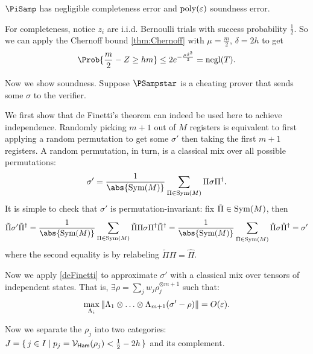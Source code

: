 \begin{thm}
    \label{QPIP1thm}
	$\PiSamp$ has negligible completeness error and $\operatorname*{\operatorname{poly}}(\varepsilon)$ soundness error.
\end{thm}
\begin{prf}
	For completeness, notice $z_i$ are i.i.d. Bernoulli trials with success probability $\frac{1}{2}$.
	So we can apply the Chernoff bound \cref{thm:Chernoff} with $\mu=\frac{m}{2}$, $\delta=2h$ to get
	$$\Prob{\frac{m}{2}-Z\geq hm}\leq2e^{-\frac{\mu\delta^2}{3}}=\negl(T).$$

	Now we show soundness.
	Suppose $\PSampstar$ is a cheating prover that sends some $\sigma$ to the verifier.

    
	We first show that de Finetti's theorem can indeed be used here to achieve independence.
	Randomly picking $m+1$ out of $M$ registers is equivalent to first applying a random permutation to get some $\sigma'$ then taking the first $m+1$ registers.
	A random permutation, in turn, is a classical mix over all possible permutations:
	$$\sigma'=\frac{1}{\abs{\Sym(M)}}\sum_{\Pi\in\Sym(M)}\Pi\sigma\Pi^\dagger.$$
	It is simple to check that $\sigma'$ is permutation-invariant:
	fix $\tilde{\Pi}\in\operatorname{Sym}(M)$, then
	$$\tilde{\Pi}\sigma'\tilde{\Pi}^\dagger
	=\frac{1}{\abs{\Sym(M)}}\sum_{\Pi\in\Sym(M)}\tilde{\Pi}\Pi\sigma\Pi^\dagger\tilde{\Pi}^\dagger
	=\frac{1}{\abs{\Sym(M)}}\sum_{\hat{\Pi}\in\Sym(M)}\hat{\Pi}\sigma\hat{\Pi}^\dagger
	=\sigma'$$
	where the second equality is by relabeling $\tilde{\Pi}\Pi=\hat{\Pi}$.

	Now we apply \cref{deFinetti}  to approximate $\sigma'$ with a classical mix over tensors of independent states.
	That is, $\exists\rho=\sum_j w_j\rho_j^{\otimes m+1}$  such that:
	$$\max_{\Lambda_i}\left\lVert\Lambda_1\otimes\ldots\otimes\Lambda_{m+1}(\sigma'-\rho)\right\rVert=O(\varepsilon).$$

	Now we separate the $\rho_j$ into two categories: $J=\set{j\in I|p_j=\mathcal{V}_{\mathsf{Ham}}(\rho_j)<\frac{1}{2}-2h}$ and its complement.


\end{prf}
